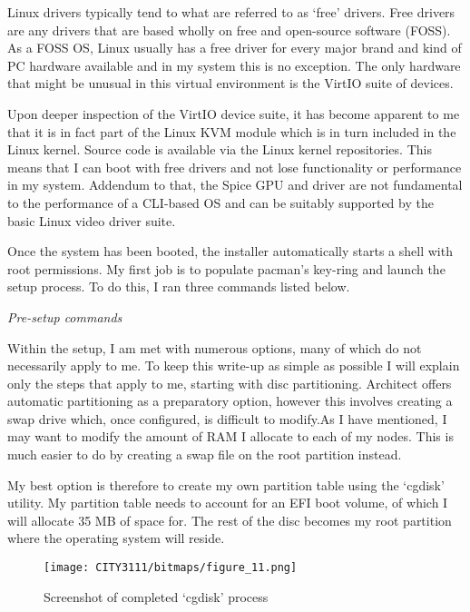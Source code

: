 Linux drivers typically tend to what are referred to as `free' drivers. Free drivers are any drivers that are based wholly on free and open-source software (FOSS). As a FOSS OS, Linux usually has a free driver for every major brand and kind of PC hardware available and in my system this is no exception. The only hardware that might be unusual in this virtual environment is the VirtIO suite of devices.

Upon deeper inspection of the VirtIO device suite, it has become apparent to me that it is in fact part of the Linux KVM module which is in turn included in the Linux kernel. Source code is available via the Linux kernel repositories. This means that I can boot with free drivers and not lose functionality or performance in my system. Addendum to that, the Spice GPU and driver are not fundamental to the performance of a CLI-based OS and can be suitably supported by the basic Linux video driver suite.

Once the system has been booted, the installer automatically starts a shell with root permissions. My first job is to populate pacman's key-ring and launch the setup process. To do this, I ran three commands listed below.


\begin{center}
    \emph{Pre-setup commands}
\end{center}

Within the setup, I am met with numerous options, many of which do not necessarily apply to me. To keep this write-up as simple as possible I will explain only the steps that apply to me, starting with disc partitioning. Architect offers automatic partitioning as a preparatory option, however this involves creating a swap drive which, once configured, is difficult to modify.As I have mentioned, I may want to modify the amount of RAM I allocate to each of my nodes. This is much easier to do by creating a swap file on the root partition instead.

My best option is therefore to create my own partition table using the `cgdisk' utility. My partition table needs to account for an EFI boot volume, of which I will allocate 35 MB of space for. The rest of the disc becomes my root partition where the operating system will reside.
\vfill\break

\begin{figure}[H]
    \texttt{[image: CITY3111/bitmaps/figure\_11.png]}
    \caption{Screenshot of completed `cgdisk' process}
    \label{figure_11}
\end{figure}


